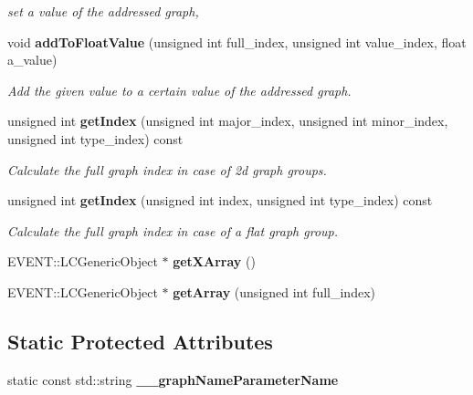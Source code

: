 \begin{DoxyCompactItemize}
\begin{DoxyCompactList}\small\item\em set a value of the addressed graph, \item\end{DoxyCompactList}\item 
void {\bf addToFloatValue} (unsigned int full\_\-index, unsigned int value\_\-index, float a\_\-value)\label{classhistmgr_1_1GraphCollection__t_a5e747206119488483b0b46c11342dace}

\begin{DoxyCompactList}\small\item\em Add the given value to a certain value of the addressed graph. \item\end{DoxyCompactList}\item 
unsigned int {\bf getIndex} (unsigned int major\_\-index, unsigned int minor\_\-index, unsigned int type\_\-index) const \label{classhistmgr_1_1GraphCollection__t_ae56f52a4ec2a8188b7a3be59c2f90090}

\begin{DoxyCompactList}\small\item\em Calculate the full graph index in case of 2d graph groups. \item\end{DoxyCompactList}\item 
unsigned int {\bf getIndex} (unsigned int index, unsigned int type\_\-index) const \label{classhistmgr_1_1GraphCollection__t_a6babd769d8db88965939660a221ea4b9}

\begin{DoxyCompactList}\small\item\em Calculate the full graph index in case of a flat graph group. \item\end{DoxyCompactList}\item 
EVENT::LCGenericObject $\ast$ {\bfseries getXArray} ()\label{classhistmgr_1_1GraphCollection__t_a2dbf7fc55d252547d24cbac999f0f55e}

\item 
EVENT::LCGenericObject $\ast$ {\bfseries getArray} (unsigned int full\_\-index)\label{classhistmgr_1_1GraphCollection__t_a3e2a4928f2ff0d2249771d76be53c82e}

\end{DoxyCompactItemize}
\subsection*{Static Protected Attributes}
\begin{DoxyCompactItemize}
\item 
static const std::string {\bfseries \_\-\_\-graphNameParameterName}\label{classhistmgr_1_1GraphCollection__t_a1c88428395aa2448fa920b2fd3fc21c1}

\end{DoxyCompactItemize}

